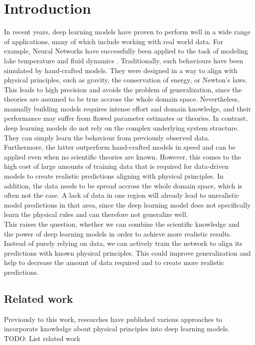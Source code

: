 \label{section:introduction}
\section{Introduction}

In recent years, deep learning models have proven to perform well in a wide range of applications, many of which include working with real world data. For example, Neural Networks have successfully been applied to the task of modeling lake temperature \cite{DBLP:journals/corr/abs-1710-11431} and fluid dynamics \cite{DBLP:journals/corr/SinghMD16}. Traditionally, such behaviours have been simulated by hand-crafted models. They were designed in a way to align with physical principles, such as gravity, the conservation of energy, or Newton's laws. This leads to high precision and avoids the problem of generalization, since the theories are assumed to be true accross the whole domain space. Nevertheless, manually building models requires intense effort and domain knowledge, and their performance may suffer from flawed parameter estimates or theories. In contrast, deep learning models do not rely on the complex underlying system structure. They can simply learn the behaviour from previously observed data. Furthermore, the latter outperform hand-crafted models in speed and can be applied even when no scientific theories are known. However, this comes to the high cost of large amounts of training data that is required for data-driven models to create realistic predictions aligning with physical principles. In addition, the data needs to be spread accross the whole domain space, which is often not the case. A lack of data in one region will already lead to unrealistic model predictions in that area, since the deep learning model does not specifically learn the physical rules and can therefore not generalize well.\\
\indent This raises the question, whether we can combine the scientific knowledge and the power of deep learning models in order to achieve more realistic results. Instead of purely relying on data, we can actively train the network to align its predictions with known physical principles. This could improve generalization and help to decrease the amount of data required and to create more realistic predictions.\\


\subsection{Related work}
Previously to this work, researches have published various approaches to incorporate knowledge about physical principles into deep learning models. \\
TODO: List related work

\clearpage

